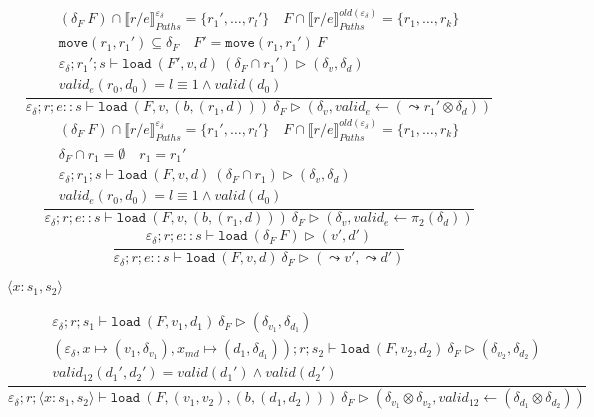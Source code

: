 \documentclass{report}
\theoremstyle{theorem}
\begin{document}
\begin{displaymath}
	\frac{\begin{array}{c}
		(\delta_F~F) \cap \llbracket r/e \rrbracket^{\varepsilon_\delta}_{Paths} = \{r_1',\dots,r_l'\} \quad
		F \cap \llbracket r/e \rrbracket^{old(\varepsilon_\delta)}_{Paths} = \{r_1,\dots,r_k\} \\
		\mathtt{move}(r_1,r_1') \subseteq \delta_F \quad F' = \mathtt{move}(r_1,r_1')~F \\
		\varepsilon_\delta ; r_1' ; s \vdash \mathtt{load}~ (F',v,d)~ (\delta_F \cap r_1') \rhd (\delta_v,\delta_d)\\
		valid_{e} (r_0,d_0) = l \equiv 1 \wedge valid(d_0)
	\end{array}}
	{\varepsilon_\delta ; r ; e::s \vdash \mathtt{load}~ (F,v,(b,(r_1,d)))~ \delta_F \rhd (\delta_v,valid_{e} \leftarrow (\leadsto r_1' \otimes \delta_d))}
\end{displaymath}
\begin{displaymath}
	\frac{\begin{array}{c}
		(\delta_F~F) \cap \llbracket r/e \rrbracket^{\varepsilon_\delta}_{Paths} = \{r_1',\dots,r_l'\} \quad
		F \cap \llbracket r/e \rrbracket^{old(\varepsilon_\delta)}_{Paths} = \{r_1,\dots,r_k\} \\
		\delta_F \cap r_1 = \emptyset \quad r_1 = r_1'\\
		\varepsilon_\delta ; r_1 ; s \vdash \mathtt{load}~ (F,v,d)~ (\delta_F \cap r_1) \rhd (\delta_v,\delta_d)\\
		valid_{e} (r_0,d_0) = l \equiv 1 \wedge valid(d_0)
	\end{array}}
	{\varepsilon_\delta ; r ; e::s \vdash \mathtt{load}~ (F,v,(b,(r_1,d)))~ \delta_F \rhd (\delta_v,valid_{e} \leftarrow \pi_2 (\delta_d))}
\end{displaymath}
\begin{displaymath}
	\frac{\begin{array}{c}
		\varepsilon_\delta;r;e :: s \vdash \mathtt{load}~ (\delta_F~F) \rhd (v',d')
	\end{array}}
	{\varepsilon_\delta ; r ; e::s \vdash \mathtt{load}~ (F,v,d)~ \delta_F \rhd (\leadsto v',\leadsto d')}
\end{displaymath}

$\boxed{\langle x : s_1, s_2 \rangle}$

\begin{displaymath}
	\frac{\begin{array}{c}
		\varepsilon_\delta ; r ; s_1 \vdash \mathtt{load}~ (F,v_1,d_1)~ \delta_F \rhd (\delta_{v_1},\delta_{d_1})\\
		(\varepsilon_\delta,x \mapsto (v_1,\delta_{v_1}),x_{md} \mapsto (d_1,\delta_{d_1})) ; r ; s_2 \vdash \mathtt{load}~ (F,v_2,d_2)~ \delta_F \rhd (\delta_{v_2},\delta_{d_2})\\
		valid_{12}({d_1}',{d_2}') = valid({d_1}') \wedge valid({d_2}')
	\end{array}}
	{\varepsilon_\delta ; r ; \langle x:s_1,s_2 \rangle \vdash \mathtt{load}~ (F,(v_1,v_2),(b,(d_1,d_2)))~ \delta_F \rhd (\delta_{v_1} \otimes \delta_{v_2},valid_{12} \leftarrow (\delta_{d_1} \otimes \delta_{d_2})) }
\end{displaymath}
\end{document}
